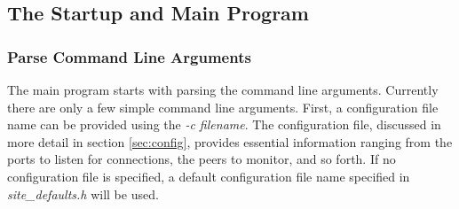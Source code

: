 




\subsection{The Startup and Main Program}

\subsubsection{Parse Command Line Arguments}
The main program starts with parsing the command line arguments.   Currently there are only a few simple command line arguments.    First,  a configuration file name can be provided using the \emph{-c filename}.   The configuration file, discussed in more detail in section \ref{sec:config}, provides essential information ranging from the ports to listen for connections,  the peers to monitor, and so forth.    If no configuration file is specified, a default configuration file name specified in \emph{site\_defaults.h} will be used. 

